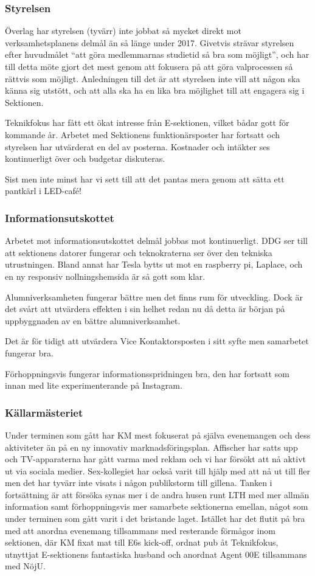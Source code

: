 \documentclass[../_main/handlingar.tex]{subfiles}
\begin{document}

\subsubsection*{Styrelsen}
Överlag har styrelsen (tyvärr) inte jobbat så mycket direkt mot verksamhetsplanens delmål än så länge under 2017. Givetvis strävar styrelsen efter huvudmålet ``att göra medlemmarnas studietid så bra som möjligt'', och har till detta möte gjort det mest genom att fokusera på att göra valprocessen så rättvis som möjligt. Anledningen till det är att styrelsen inte vill att någon ska känna sig utstött, och att alla ska ha en lika bra möjlighet till att engagera sig i Sektionen.

Teknikfokus har fått ett ökat intresse från E-sektionen, vilket bådar gott för kommande år. Arbetet med Sektionens funktionärsposter har fortsatt och styrelsen har utvärderat en del av posterna. Kostnader och intäkter ses kontinuerligt över och budgetar diskuteras.

Sist men inte minst har vi sett till att det pantas mera genom att sätta ett pantkärl i LED-café!

\subsubsection*{Informationsutskottet}
Arbetet mot informationsutskottet delmål jobbas mot kontinuerligt. DDG ser till att sektionens datorer fungerar och teknokraterna ser över den tekniska utrustningen. Bland annat har Tesla bytts ut mot en raspberry pi, Laplace, och en ny responsiv nollningshemsida är så gott som klar.

Alumniverksamheten fungerar bättre men det finns rum för utveckling. Dock är det svårt att utvärdera effekten i sin helhet redan nu då detta är början på uppbyggnaden av en bättre alumniverksamhet.

Det är för tidigt att utvärdera Vice Kontaktorsposten i sitt syfte men samarbetet fungerar bra.

Förhoppningsvis fungerar informationsspridningen bra, den har fortsatt som innan med lite experimenterande på Instagram.

\subsubsection*{Källarmästeriet}
Under terminen som gått har KM mest fokuserat på själva evenemangen och dess aktiviteter än på en ny innovativ marknadsföringsplan. Affischer har satts upp och TV-apparaterna har gått varma med reklam och vi har försökt att nå aktivt ut via sociala medier. Sex-kollegiet har också varit till hjälp med att nå ut till fler men det har tyvärr inte visats i någon publikstorm till gillena. Tanken i fortsättning är att försöka synas mer i de andra husen runt LTH med mer allmän information samt förhoppningsvis mer samarbete sektionerna emellan, något som under terminen som gått varit i det bristande laget. Istället har det flutit på bra med att anordna evenemang tillsammans med resterande förmågor inom sektionen, där KM fixat mat till E6s kick-off, ordnat pub åt Teknikfokus, utnyttjat E-sektionens fantastiska husband och anordnat Agent 00E tillsammans med NöjU.
\end{document}
